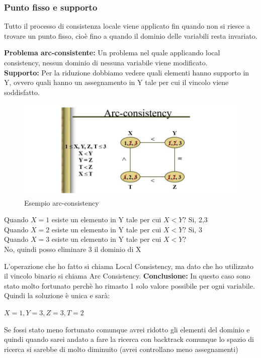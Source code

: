 \subsubsection{Punto fisso e supporto}
Tutto il processo di consistenza locale viene applicato fin quando non si riesce a trovare un punto fisso, cioè fino a quando il dominio delle variabili resta invariato.

\vspace{0.5cm}

\textbf{Problema arc-consistente:} Un problema nel quale applicando local consistency, nessun dominio di nessuna variabile viene modificato.
\\
\textbf{Supporto:} Per la riduzione dobbiamo vedere quali elementi hanno supporto in Y, ovvero quali hanno un assegnamento in Y tale per cui il vincolo viene soddisfatto.
\begin{figure}[htp]
	\centering
    \includegraphics[width=13cm, keepaspectratio]{img/Cap3/esempio-arc.png}
    \caption{Esempio arc-consistency}
\end{figure}
\begin{center}
    Quando $X=1$ esiste un elemento in Y tale per cui $X < Y$? Si, 2,3
    \\Quando $X=2$ esiste un elemento in Y tale per cui $X < Y$? Si, 3
    \\Quando $X=3$ esiste un elemento in Y tale per cui $X < Y$?
    \\No, quindi posso eliminare 3 il dominio di X    
\end{center}
L’operazione che ho fatto si chiama Local Consistency, ma dato che ho utilizzato il vincolo binario si chiama Arc Consistency.
\newpage
\textbf{Conclusione:} In questo caso sono stato molto fortunato perchè ho rimasto 1 solo valore possibile per ogni variabile. Quindi la soluzione è unica e sarà:
\begin{center}
    $X = 1, Y = 3, Z = 3, T = 2$
\end{center}
Se fossi stato meno fortunato comunque avrei ridotto gli elementi del dominio e quindi quando sarei andato a fare la ricerca con backtrack comunque lo spazio di ricerca si sarebbe di molto diminuito (avrei controllano meno assegnamenti)
